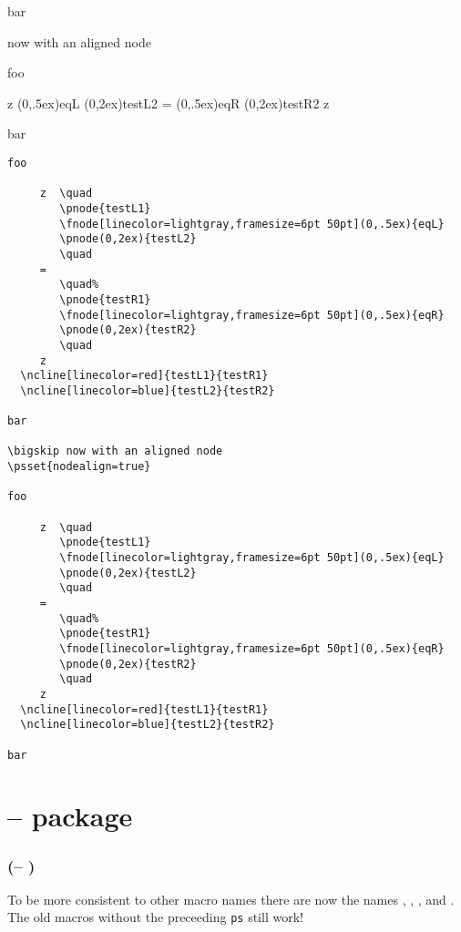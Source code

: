 \documentclass[11pt,english,BCOR10mm,DIV12,bibliography=totoc,parskip=false,smallheadings
    headexclude,footexclude,oneside]{pst-doc}
\let\pstplotFV\fileversion
\let\pstplotFD\filedate
\begin{document}
bar

\bigskip now with an aligned node

foo

     z  \quad
        \fnode[linecolor=lightgray,framesize=6pt 50pt](0,.5ex){eqL}
        \pnode(0,2ex){testL2}
        \quad
     =
        \quad%
        \fnode[linecolor=lightgray,framesize=6pt 50pt](0,.5ex){eqR}
        \pnode(0,2ex){testR2}
        \quad
     z

bar


\begin{lstlisting}
foo

     z  \quad
        \pnode{testL1}
        \fnode[linecolor=lightgray,framesize=6pt 50pt](0,.5ex){eqL}
        \pnode(0,2ex){testL2}
        \quad
     =
        \quad%
        \pnode{testR1}
        \fnode[linecolor=lightgray,framesize=6pt 50pt](0,.5ex){eqR}
        \pnode(0,2ex){testR2}
        \quad
     z
  \ncline[linecolor=red]{testL1}{testR1}
  \ncline[linecolor=blue]{testL2}{testR2}

bar

\bigskip now with an aligned node
\psset{nodealign=true}

foo

     z  \quad
        \pnode{testL1}
        \fnode[linecolor=lightgray,framesize=6pt 50pt](0,.5ex){eqL}
        \pnode(0,2ex){testL2}
        \quad
     =
        \quad%
        \pnode{testR1}
        \fnode[linecolor=lightgray,framesize=6pt 50pt](0,.5ex){eqR}
        \pnode(0,2ex){testR2}
        \quad
     z
  \ncline[linecolor=red]{testL1}{testR1}
  \ncline[linecolor=blue]{testL2}{testR2}

bar
\end{lstlisting}


\part{ -- package}

\section{ (\pstplotFV -- \pstplotFD)}

To be more consistent to other macro names there are now the names
, , , and
. The old macros without the preceeding \verb+ps+
still work!
\end{document}
